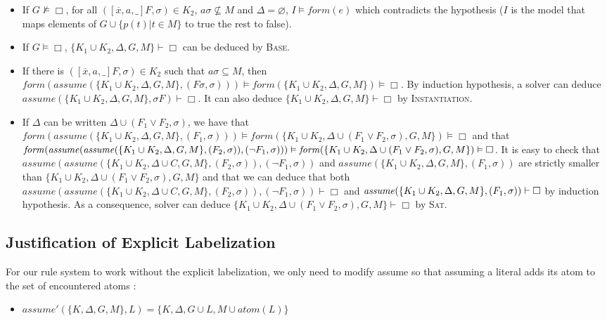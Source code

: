 \documentclass[a4paper,10pt]{report}
\newcommand{\atom}{\mathit{atom}}
\newcommand{\F}{\mathit{form}}
\newcommand{\A}{\mathit{assume}}
\begin{document}
\begin{itemize}
 \item If $G\nvDash\Box$, for all $([\overline x,a,\_]F,\sigma)\in K_2$, $a\sigma\nsubseteq M$ and
$\Delta=\varnothing$, $I\vDash\F(e)$ which contradicts the hypothesis ($I$ is the model that
maps elements of $G\cup\{p(t)|t\in M\}$ to true the rest to false).
 \item If $G\vDash\Box$, $\{K_1\cup K_2,\Delta,G,M\}\vdash\Box$ can be deduced by \textsc{Base}.
 \item If there is $([\overline x,a,\_]F,\sigma)\in K_2$ such that $a\sigma\subseteq M$, then
$\F(\A(\{K_1\cup K_2,\Delta,G,M\},(F\sigma,\sigma)))\vDash\F(\{K_1\cup K_2,\Delta,G,M\})\vDash\Box$.
By induction hypothesis,
a solver can deduce $\A(\{K_1\cup K_2,\Delta,G,M\},\sigma F)\vdash\Box$.
It can also deduce $\{K_1\cup K_2,\Delta,G,M\}\vdash\Box$ by \textsc{Instantiation}.
 \item If $\Delta$ can be written $\Delta\cup(F_1\vee F_2,\sigma)$,
we have that $\F(\A(\{K_1\cup K_2,\Delta,G,M\},(F_1,\sigma)))\vDash
\F(\{K_1\cup K_2,\Delta\cup(F_1\vee F_2,\sigma),G,M\})\vDash\Box$
and that $\F(\A(\A(\{K_1\cup K_2,\Delta,G,M\},\linebreak (F_2,\sigma)),(\neg F_1,\sigma)))\vDash
\F(\{K_1\cup K_2,\Delta\cup(F_1\vee F_2,\sigma),G,M\})\vDash\Box$.
It is easy to check that $\A(\A(\{K_1\cup K_2,\Delta\cup C,G,M\},(F_2,\sigma)),(\neg F_1,\sigma))$ and
$\A(\{K_1\cup K_2,\Delta,G,M\}, (F_1,\sigma))$ are strictly smaller than
$\{K_1\cup K_2,\Delta\cup (F_1\vee F_2,\sigma),G,M\}$
and that we can deduce that both
$\A(\A(\{K_1\cup K_2,\Delta\cup C,G,M\},(F_2,\sigma)),(\neg F_1,\sigma))\vdash\Box$ and
$\A(\{K_1\cup K_2,\Delta,G,M\},\linebreak (F_1,\sigma))\vdash\Box$ by induction hypothesis.
As a consequence, solver can deduce $\{K_1\cup K_2,\Delta\cup(F_1\vee F_2,\sigma),G,M\}\vdash\Box$ by \textsc{Sat}.
\end{itemize}

\subsection{Justification of Explicit Labelization}
For our rule system to work without the explicit labelization, we only need to modify assume so that
assuming a literal adds its atom to the set of encountered atoms :
\begin{itemize}
 \item $\A'(\{K,\Delta,G,M\},L) = \{K,\Delta,G\cup L, M\cup\atom(L)\}$
\end{itemize}
\end{document}
